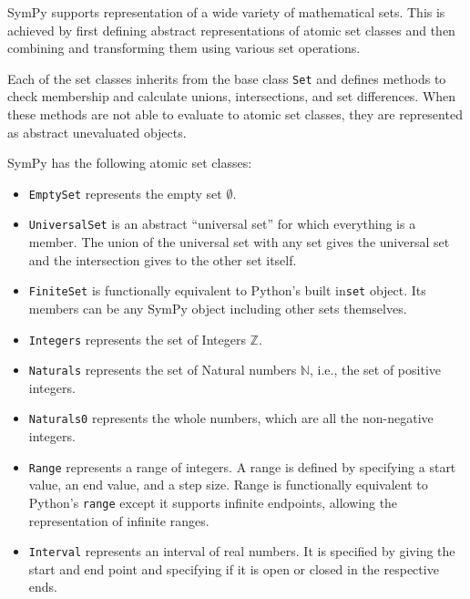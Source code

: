 
SymPy supports representation of a wide variety of mathematical sets. This is
achieved by first defining abstract representations of atomic set classes and
then combining and transforming them using various set operations.

Each of the set classes inherits from the base class \texttt{Set} and defines
methods to check membership and calculate unions, intersections, and set
differences. When these methods are not able to evaluate to atomic set
classes, they are represented as abstract unevaluated objects.

SymPy has the following atomic set classes:

\begin{itemize}

    \item \verb|EmptySet| represents the empty set $\emptyset$.

    \item \verb|UniversalSet| is an abstract ``universal set'' for which
      everything is a member. The union of the universal set with any set
      gives the universal set and the intersection gives to the other set
      itself.

    \item \verb|FiniteSet| is functionally equivalent to Python's built
      in\texttt{set} object. Its members can be any SymPy object including
      other sets themselves.

    \item \verb|Integers| represents the set of Integers $\mathbb{Z}$.

    \item \verb|Naturals| represents the set of Natural numbers $\mathbb{N}$,
      i.e., the set of positive integers.

    \item \verb|Naturals0| represents the whole numbers, which are all the
      non-negative integers.

    \item \verb|Range| represents a range of integers. A range is defined by
      specifying a start value, an end value, and a step size. Range is
      functionally equivalent to Python's \texttt{range} except it supports
      infinite endpoints, allowing the representation of infinite ranges.

    \item \verb|Interval| represents an interval of real numbers. It is
      specified by giving the start and end point and specifying if it is open
      or closed in the respective ends.


\end{itemize}


